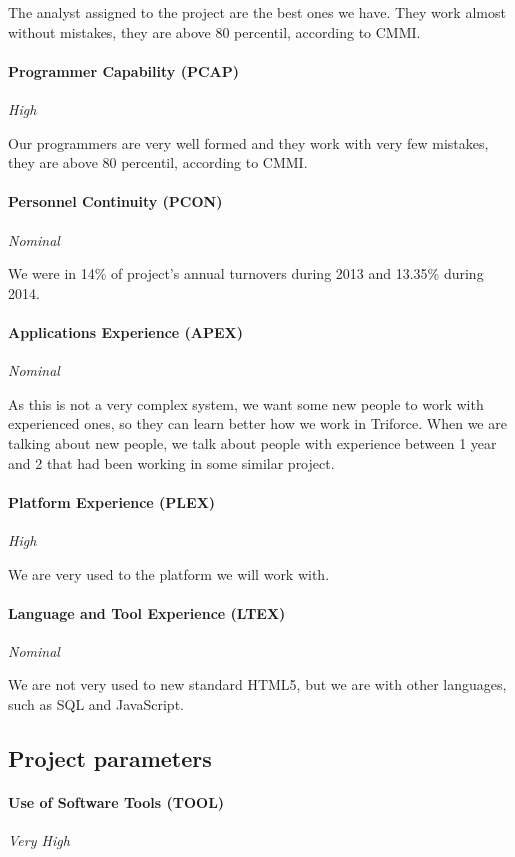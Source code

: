 \documentclass[11pt]{report}
\begin{document}
The analyst assigned to the project are the best ones we have. They work almost without mistakes, they are above 80 percentil, according to CMMI.

\paragraph{Programmer Capability (PCAP) } \textit{High}

Our programmers are very well formed and they work with very few mistakes, they are above 80 percentil, according to CMMI.

\paragraph{Personnel Continuity (PCON) } \textit{Nominal}

We were in 14\% of project's annual turnovers during 2013 and 13.35\% during 2014.

\paragraph{Applications Experience (APEX) } \textit{Nominal}

As this is not a very complex system, we want some new people to work with experienced ones, so they can learn better how we work in Triforce. When we are talking about new people, we talk about people with experience between 1 year and 2 that had been working in some similar project. 


\paragraph{Platform Experience (PLEX) } \textit{High}

We are very used to the platform we will work with. 

\paragraph{Language and Tool Experience (LTEX) } \textit{Nominal}

We are not very used to new standard HTML5, but we are with other languages, such as SQL and JavaScript.


\subsection{Project parameters}
\paragraph{Use of Software Tools (TOOL) } \textit{Very High}
\end{document}
